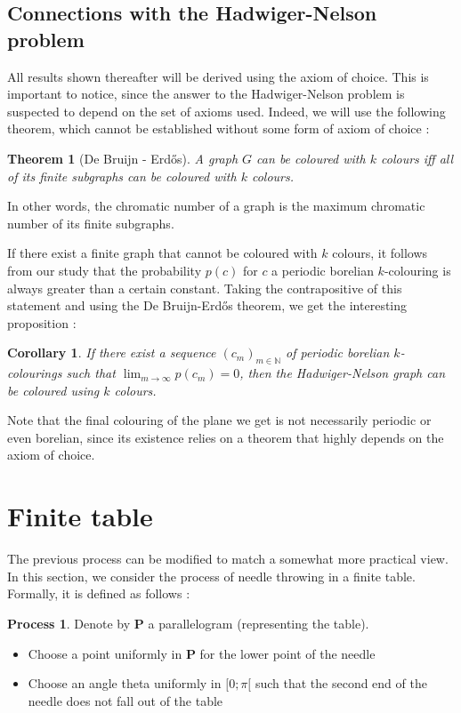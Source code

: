\documentclass[a4paper,11pt]{article}
\newtheorem{cons}{Corollary}
\newtheorem{theo}{Theorem}
\theoremstyle{definition}
\newtheorem{process}{Process}
\theoremstyle{remark}
\begin{document}
\subsection{Connections with the Hadwiger-Nelson problem} \label{hn}
All results shown thereafter will be derived using the axiom of choice. 
This is important to notice, since the answer to the Hadwiger-Nelson problem is 
suspected to depend on the set of axioms used. Indeed, we will use the 
following theorem, which cannot be established without some form of axiom of 
choice :
\begin{theo}[De Bruijn - Erdős]
 A graph $G$ can be coloured with $k$ colours iff all of its finite subgraphs 
 can be coloured with $k$ colours.
\end{theo}
In other words, the chromatic number of a graph is the maximum chromatic number 
of its finite subgraphs.

If there exist a finite graph that cannot be coloured with $k$ colours, it 
follows from our study that the probability $p(c)$ for $c$ a periodic borelian 
$k$-colouring is always greater than a certain constant. Taking the 
contrapositive of this statement and using the De Bruijn-Erdős theorem, we get  
the interesting proposition :
\begin{cons}
 If there exist a sequence $(c_m)_{m \in \mathbb{N}}$ of periodic borelian 
 $k$-colourings such that $\lim_{m \to \infty} p(c_m) = 0$, then the 
 Hadwiger-Nelson graph can be coloured using $k$ colours.
\end{cons}
Note that the final colouring of the plane we get is not necessarily periodic 
or even borelian, since its existence relies on a theorem that highly depends 
on the axiom of choice.

\section{Finite table} \label{fini}

The previous process can be modified to match a somewhat more practical view. 
In this section, we consider the process of needle throwing in a finite table. 
Formally, it is defined as follows :


\begin{process}
Denote by $\mathbf{P}$ a parallelogram (representing the table). 
\begin{itemize}
\item Choose a point uniformly in $\mathbf{P}$ for the lower point of the needle
\item Choose an angle theta uniformly in $[0 ; \pi[$ such that the second end 
of the needle does not fall out of the table
\end{itemize}
\end{process}
\end{document}
